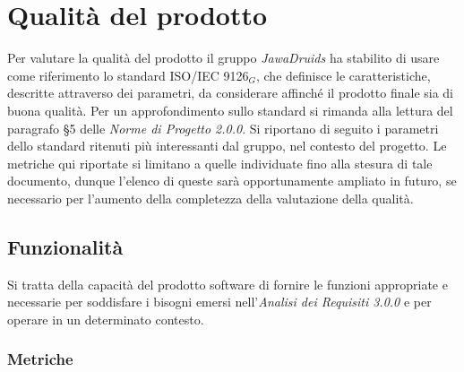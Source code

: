 \chapter{Qualità del prodotto} \label{QualitàDelProdotto}

Per valutare la qualità del prodotto il gruppo \textit{JawaDruids} ha stabilito di usare come riferimento lo standard ISO/IEC 9126$_G$, che definisce le caratteristiche, descritte attraverso dei parametri,  da considerare affinché il prodotto finale sia di buona qualità.
Per un approfondimento sullo standard si rimanda alla lettura del paragrafo §5 delle \textit{Norme di Progetto 2.0.0}.
Si riportano di seguito i parametri dello standard ritenuti più interessanti dal gruppo, nel contesto del  progetto.
Le metriche qui riportate si limitano a quelle individuate fino alla stesura di tale documento, dunque l’elenco di queste sarà opportunamente ampliato in futuro, se necessario per l’aumento della completezza della valutazione della qualità.

\section{Funzionalità} \label{QualitàDelProdottoFunzionalità}
Si tratta della capacità del prodotto software di fornire le funzioni appropriate e necessarie per soddisfare i bisogni emersi nell’\textit{Analisi dei Requisiti 3.0.0} e per operare in un determinato contesto.
\subsection{Metriche} \label{QualitàDelProdottoFunzionalitàMetriche}
